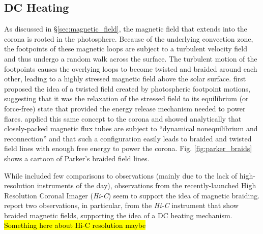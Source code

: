 \subsection{DC Heating}
\label{subsec:dc_heating}
\par As discussed in \S\ref{sec:magnetic_field}, the magnetic field that extends into the corona is rooted in the photosphere. Because of the underlying convection zone, the footpoints of these magnetic loops are subject to a turbulent velocity field and thus undergo a random walk across the surface. The turbulent motion of the footpoints causes the overlying loops to become twisted and braided around each other, leading to a highly stressed magnetic field above the solar surface. \citet{gold_magnetic_1964} first proposed the idea of a twisted field created by photospheric footpoint motions, suggesting that it was the relaxation of the stressed field to its equilibrium (or force-free) state that provided the energy release mechanism needed to power flares. \citet{parker_magnetic_1983,parker_magnetic_1983-1} applied this same concept to the corona and showed analytically that closely-packed magnetic flux tubes are subject to ``dynamical nonequilibrium and reconnection'' and that such a configuration easily leads to braided and twisted field lines with enough free energy to power the corona. Fig. \ref{fig:parker_braids} shows a cartoon of Parker's braided field lines. 
%
\par While \citet{gold_magnetic_1964,parker_magnetic_1983,parker_magnetic_1983-1} included few comparisons to observations (mainly due to the lack of high-resolution instruments of the day), observations from the recently-launched High Resolution Coronal Imager (\textit{Hi-C}) seem to support the idea of magnetic braiding. \citet{cirtain_energy_2013} report two observations, in particular, from the \textit{Hi-C} instrument that show braided magnetic fields, supporting the idea of a DC heating mechanism. \hl{Something here about Hi-C resolution maybe}
%
